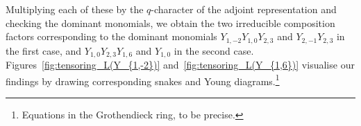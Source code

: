 \documentclass[12pt,reqno]{amsart}
\numberwithin{equation}{section}
\begin{document}
Multiplying each of these by the $q$-character of the adjoint representation and checking the dominant monomials, we obtain the two irreducible composition factors corresponding to the dominant monomials $Y_{1,-2}Y_{1,0}Y_{2,3}$ and $Y_{2,-1}Y_{2,3}$ in the first case, and $Y_{1,0}Y_{2,3}Y_{1,6}$ and $Y_{1,0}$ in the second case. Figures~\ref{fig:tensoring_L(Y_{1,-2})} and~\ref{fig:tensoring_L(Y_{1,6})} visualise our findings by drawing corresponding snakes and Young diagrams.\footnote{Equations in the Grothendieck ring, to be precise.}
\begin{figure}[htbp]
	\centering
	
\end{figure}
\end{document}
